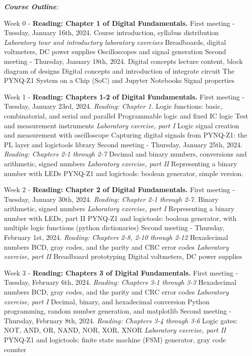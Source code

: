 \documentclass[10pt]{article}
\begin{document}
\textit{\textbf{Course Outline}:}
\begin{outline}[enumerate]

\1 Week 0 - \textbf{Reading: Chapter 1 of Digital Fundamentals.}
\2 First meeting - Tuesday, January 16th, 2024.
\3 Course introduction, syllabus distribution
\3 \textit{Laboratory tour and introductory laboratory exercises}
\4 Breadboards, digital voltmeters, DC power supplies
\4 Oscilloscopes and signal generation
\2 Second meeting - Thursday, January 18th, 2024.
\3 Digital concepts lecture content, block diagram of designs
\3 Digital concepts and introduction of integrate circuit
\4 The PYNQ-Z1 System on a Chip (SoC) and Jupyter Notebooks
\4 Signal properties

\1 Week 1 - \textbf{Reading: Chapters 1-2 of Digital Fundamentals.}
\2 First meeting - Tuesday, January 23rd, 2024. \textit{Reading: Chapter 1.}
\3 Logic functions: basic, combinatorial, and serial and parallel
\3 Programmable logic and fixed IC logic
\3 Test and measurement instruments
\3 \textit{Laboratory exercise, part I}
\4 Logic signal creation and measurement with oscilloscope
\4 Capturing digital signals from PYNQ-Z1: the PL layer and logictools library
\2 Second meeting - Thursday, January 25th, 2024. \textit{Reading: Chapters 2-1 through 2-7}
\3 Decimal and binary numbers, conversions and arithmetic, signed numbers
\3 \textit{Laboratory exercise, part II}
\4 Representing a binary number with LEDs
\4 PYNQ-Z1 and logictools: boolean generator, simple version.

\1 Week 2 - \textbf{Reading: Chapter 2 of Digital Fundamentals.}
\2 First meeting - Tuesday, January 30th, 2024. \textit{Reading: Chapter 2-1 through 2-7.}
\3 Binary arithmetic, signed numbers
\3 \textit{Laboratory exercise, part I}
\4 Representing a binary number with LEDs, part II
\4 PYNQ-Z1 and logictools: boolean generator, with multiple logic functions (python dictionaries)
\2 Second meeting - Thursday, February 1st, 2024. \textit{Reading: Chapters 2-8, 2-10 through 2-12}
\3 Hexadecimal numbers
\3 BCD, gray codes, and the parity and CRC error codes
\3 \textit{Laboratory exercise, part II}
\4 Breadboard prototyping
\4 Digital voltmeters, DC power supplies

\1 Week 3 - \textbf{Reading: Chapters 3 of Digital Fundamentals.}
\2 First meeting - Tuesday, February 6th, 2024.  \textit{Reading: Chapters 3-1 through 3-3}
\3 Hexadecimal numbers
\3 BCD, gray codes, and the parity and CRC error codes
\3 \textit{Laboratory exercise, part I}
\4 Decimal, binary, and hexadecimal conversion
\4 Python programming, random number generation, and matplotlib
\2 Second meeting - Thursday, February 8th, 2024. \textit{Reading: Chapters 3-4 through 3-6}
\3 Logic gates: NOT, AND, OR, NAND, NOR, XOR, XNOR
\3 \textit{Laboratory exercise, part II}
\4 PYNQ-Z1 and logictools: finite state machine (FSM) generator, gray code counter


\end{outline}
\end{document}

